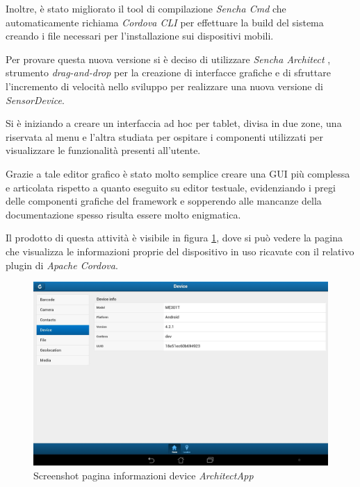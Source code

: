 Inoltre, è stato migliorato il tool di compilazione \emph{Sencha Cmd} che automaticamente richiama \emph{Cordova \ac{CLI}} per effettuare la build del sistema creando i file necessari per l'installazione sui dispositivi mobili.

Per provare questa nuova versione si è deciso di utilizzare \emph{Sencha Architect} \cite{sencha:architect}, strumento \emph{drag-and-drop} per la creazione di interfacce grafiche e di sfruttare l'incremento di velocità nello sviluppo per realizzare una nuova versione di \emph{SensorDevice}.

Si è iniziando a creare un interfaccia ad hoc per tablet, divisa in due zone, una riservata al menu e l'altra studiata per ospitare i componenti utilizzati per visualizzare le funzionalità presenti all'utente.

Grazie a tale editor grafico è stato molto semplice creare una \ac{GUI} più complessa e articolata rispetto a quanto eseguito su editor testuale, evidenziando i pregi delle componenti grafiche del framework e sopperendo alle mancanze della documentazione spesso risulta essere molto enigmatica.

Il prodotto di questa attività è visibile in figura \ref{fig:screenshot device architect}, dove si può vedere la pagina che visualizza le informazioni proprie del dispositivo in uso ricavate con il relativo plugin di \emph{Apache Cordova}.

\begin{figure}[htb]
\centering
\includegraphics[scale=0.25]{gfx/screenshot/screen_device_architect}
\caption{Screenshot pagina informazioni device \emph{ArchitectApp}}
\label{fig:screenshot device architect}
\end{figure}